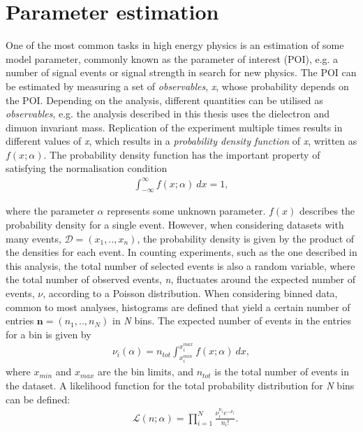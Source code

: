 \section{Parameter estimation}
One of the most common tasks in high energy physics is an estimation of some model parameter, commonly known as the parameter of interest (POI), e.g. a number of signal events or signal strength in search for new physics. The POI can be estimated by measuring a set of \emph{observables}, \emph{x}, whose probability depends on the POI. Depending on the analysis, different quantities can be utilised as \emph{observables}, e.g. the analysis described in this thesis uses the dielectron and dimuon invariant mass. Replication of the experiment multiple times results in different values of \emph{x}, which results in a \emph{probability density function} of \emph{x}, written as $f(x;\alpha)$. The probability density function has the important property of satisfying the normalisation condition
\begin{equation}
    \begin{aligned}
        \int_{-\infty}^{\infty} f(x;\alpha)~dx = 1,
    \end{aligned}
\end{equation}

where the parameter $\alpha$ represents some unknown parameter. $f(x)$ describes the probability density for a single event. However, when considering datasets with many events, $\mathcal{D} = (x_1,..,x_n)$, the probability density is given by the product of the densities for each event. In counting experiments, such as the one described in this analysis, the total number of selected events is also a random variable, where the total number of observed events, \emph{n}, fluctuates around the expected number of events, $\nu$, according to a Poisson distribution. When considering binned data, common to most analyses, histograms are defined that yield a certain number of entries $\textbf{n} = (n_1,..,n_N)$ in \emph{N} bins. The expected number of events in the entries for a bin is given by
\begin{equation}
\begin{aligned}
    \nu_i(\alpha) = n_{tot}\int_{x_i^{min}}^{x_i^{max}} f(x;\alpha)~dx,
\end{aligned}
\end{equation}
where $x_{min}$ and $x_{max}$ are the bin limits, and $n_{tot}$ is the total number of events in the dataset. A likelihood function for the total probability distribution for \emph{N} bins can be defined:
\begin{equation}
    \label{eq:poissL}
    \begin{aligned}
        & \mathcal{L}(n;\alpha) = \prod_{i=1}^{N}\frac{\nu_{i}^{n_{i}} e^{-\nu_{i}}}{n_{i}!}. \\
    \end{aligned}
\end{equation}

